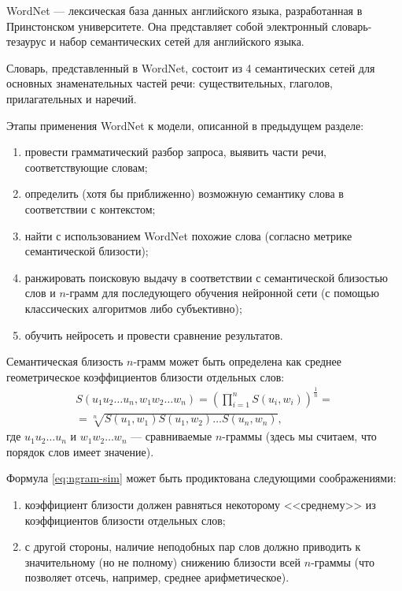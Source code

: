
WordNet \cite{Miller95wordnet:a} --- лексическая база данных английского языка, разработанная в Принстонском университете.
Она представляет собой электронный словарь-тезаурус и набор семантических сетей для английского языка.

Словарь, представленный в WordNet, состоит из 4 семантических сетей для основных знаменательных частей речи:
существительных, глаголов, прилагательных и наречий.

Этапы применения WordNet к модели, описанной в предыдущем разделе:
\begin{enumerate}[1)]
    \item провести грамматический разбор запроса, выявить части речи, соответствующие словам;
    \item определить (хотя бы приближенно) возможную семантику слова в соответствии с контекстом;
    \item найти с использованием WordNet похожие слова (согласно метрике семантической близости);
    \item ранжировать поисковую выдачу в соответствии с семантической близостью слов и $n$-грамм для
          последующего обучения нейронной сети (с помощью классических алгоритмов либо субъективно);
    \item обучить нейросеть и провести сравнение результатов.
\end{enumerate}

Семантическая близость $n$-грамм может быть определена как среднее геометрическое коэффициентов близости отдельных слов:
\begin{equation}
    \label{eq:ngram-sim}
    \begin{aligned}
        S(u_1u_2\dots u_n, w_1w_2\dots w_n) = \left( \prod\limits_{i=1}^n {S(u_i, w_i)} \right)^{\frac1n}= \\
        = \sqrt[n]{S(u_1, w_1)S(u_1, w_2)\dots S(u_n, w_n)},
    \end{aligned}
\end{equation}
где $u_1u_2\dots u_n$ и $w_1w_2\dots w_n$ --- сравниваемые $n$-граммы (здесь мы считаем, что порядок слов имеет значение).

Формула \eqref{eq:ngram-sim} может быть продиктована следующими соображениями:
\begin{enumerate}[1)]
    \item коэффициент близости должен равняться некоторому <<среднему>> из коэффициентов близости отдельных слов;
    \item с другой стороны, наличие неподобных пар слов должно приводить к значительному (но не полному) снижению
          близости всей $n$-граммы (что позволяет отсечь, например, среднее арифметическое).
\end{enumerate}

